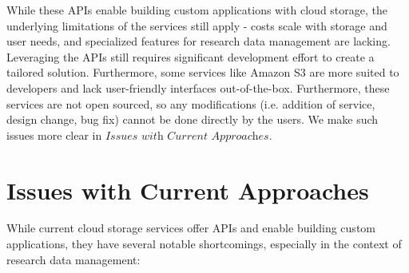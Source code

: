 \documentclass[conference]{IEEEtran}
\begin{document}
While these APIs enable building custom applications with cloud storage, the underlying limitations of the services still apply - costs scale with storage and user needs, and specialized features for research data management are lacking. Leveraging the APIs still requires significant development effort to create a tailored solution. Furthermore, some services like Amazon S3 are more suited to developers and lack user-friendly interfaces out-of-the-box.
Furthermore, these services are not open sourced, so any modifications (i.e. addition of service, design change, bug fix) cannot be done directly by the users.
We make such issues more clear in $\textit{Issues with Current Approaches}$.

\section{Issues with Current Approaches}
While current cloud storage services offer APIs and enable building custom applications, they have several notable shortcomings, especially in the context of research data management:
\end{document}
